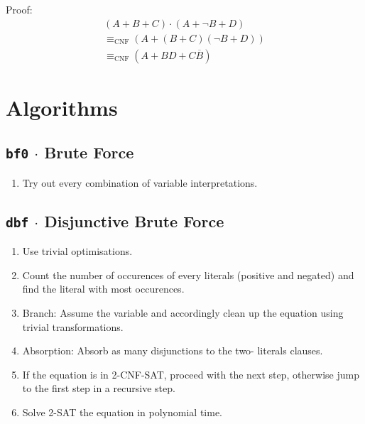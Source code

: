 \documentclass[12pt, letterpaper]{article}
\begin{document}
\begin{description}
        Proof: \begin{equation}\nonumber\begin{split}
            (A + B + C) \cdot (A + \lnot B + D) \\
            \equiv_\text{CNF} (A + (B + C)(\lnot B + D)) \\
            \equiv_\text{CNF} (A + BD + C \overline B)
        \end{split}\end{equation}

    \end{description}

    \section{Algorithms}

    \subsection*{\texttt{bf0} $\cdot$ Brute Force}

    \begin{enumerate}
        \item Try out every combination of variable interpretations.
    \end{enumerate}

    \subsection*{\texttt{dbf} $\cdot$ Disjunctive Brute Force}

    \begin{enumerate}
        \item Use trivial optimisations.

        \item Count the number of occurences of every literals
        (positive and negated) and find the literal with most
        occurences.

        \item Branch: Assume the variable and accordingly clean
        up the equation using trivial transformations.

        \item Absorption: Absorb as many disjunctions to the two-
        literals clauses.

        \item If the equation is in 2-CNF-SAT, proceed with the
        next step, otherwise jump to the first step in a recursive
        step.

        \item Solve 2-SAT the equation in polynomial time.
    \end{enumerate}
\end{document}
